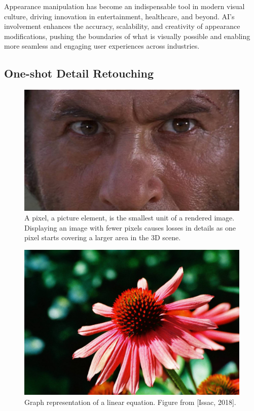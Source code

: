 Appearance manipulation has become an indispensable tool in modern visual culture, driving innovation in entertainment, healthcare, and beyond. AI's involvement enhances the accuracy, scalability, and creativity of appearance modifications, pushing the boundaries of what is visually possible and enabling more seamless and engaging user experiences across industries.


\subsection{One-shot Detail Retouching}

\begin{figure}[ht]
  \centering

    \includegraphics[width=\linewidth]{Images/A scene from ‘The Good, the Bad and the Ugly’ (1966). Image courtesy- Produzioni Europee Associati .jpg}

   \caption{A pixel, a picture element, is the smallest unit of a rendered image. Displaying an image with fewer pixels causes losses in details as one pixel starts covering a larger area in the 3D scene.}
   \label{fig:colour-approximate}
\end{figure}


\begin{figure}
  \centering
   \includegraphics[width=\linewidth]{Images/byRickJones .jpg}
   
   \caption{Graph representation of a linear equation. Figure from [Issac, 2018].}
   \label{fig:neuron}
\end{figure}

